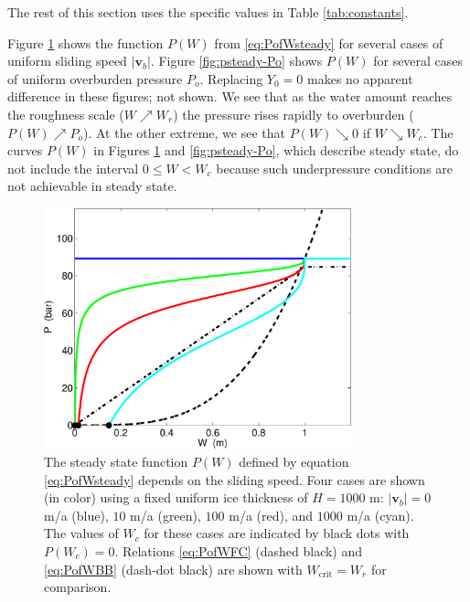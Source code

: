 \documentclass[11pt,final]{amsart}%
\newcommand\bv{\mathbf{v}}
\begin{document}
The rest of this section uses the specific values in Table \ref{tab:constants}.

\newcommand{\upto}{ \!\!\nearrow\! }
\newcommand{\downto}{ \!\searrow\! }
Figure \ref{fig:psteady-vb} shows the function $P(W)$ from \eqref{eq:PofWsteady} for several cases of uniform sliding speed $|\bv_b|$.  Figure \ref{fig:psteady-Po} shows $P(W)$ for several cases of uniform overburden pressure $P_o$.  Replacing $Y_0=0$ makes no apparent difference in these figures; not shown.  We see that as the water amount reaches the roughness scale ($W\upto W_r$) the pressure rises rapidly to overburden ($P(W) \upto P_o$).  At the other extreme, we see that $P(W) \downto 0$ if $W \downto W_c$.  The curves $P(W)$ in Figures \ref{fig:psteady-vb} and \ref{fig:psteady-Po}, which describe steady state, do not include the interval $0\le W < W_c$ because such underpressure conditions are not achievable in steady state.

\begin{figure}[ht]
\includegraphics[width=3.5in,keepaspectratio=true]{psteady-vb}
\medskip
\caption{The steady state function $P(W)$ defined by equation \eqref{eq:PofWsteady} depends on the sliding speed.  Four cases are shown (in color) using a fixed uniform ice thickness of $H=1000$ m: $|\bv_b|=0$ m/a (blue), $10$ m/a (green), $100$ m/a (red), and $1000$ m/a (cyan).  The values of $W_c$ for these cases are indicated by black dots with $P(W_c)=0$.  Relations \eqref{eq:PofWFC} (dashed black) and \eqref{eq:PofWBB} (dash-dot black) are shown with $W_{\text{crit}}=W_r$ for comparison.}
\label{fig:psteady-vb}
\end{figure}
\end{document}
